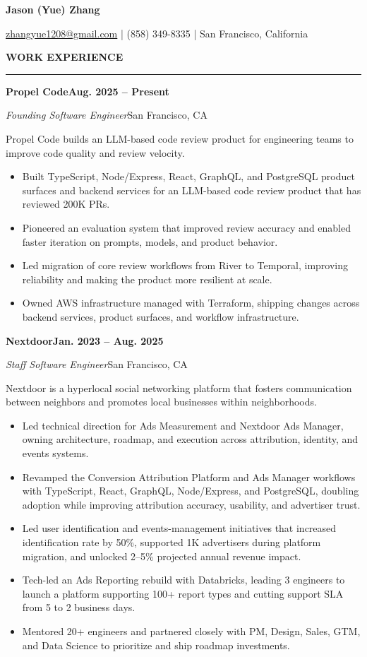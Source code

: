 \documentclass[10pt,letterpaper]{article}
\newcommand{\resumesection}[1]{
  \vspace{10pt}
  {\normalsize\bfseries\MakeUppercase{#1}\par}
  \vspace{3pt}
  \hrule
  \vspace{7pt}
}
\newcommand{\companyheading}[2]{
  \noindent\textbf{#1}\hfill\textbf{#2}\par
}
\newcommand{\roleheading}[2]{
  \noindent\textit{#1}\hfill #2\par
}
\newcommand{\companysummary}[1]{
  {\small #1\par}
  \vspace{2pt}
}
\newcommand{\entryspace}{
  \vspace{6pt}
}
\begin{document}
{\LARGE \textbf{Jason (Yue) Zhang}\par}
\vspace{4pt}
{\normalsize
\href{mailto:zhangyue1208@gmail.com}{zhangyue1208@gmail.com}
\;|\;
(858) 349-8335
\;|\;
San Francisco, California\par
}

\resumesection{Work Experience}

\companyheading{Propel Code}{Aug. 2025 -- Present}
\roleheading{Founding Software Engineer}{San Francisco, CA}
\companysummary{Propel Code builds an LLM-based code review product for engineering teams to improve code quality and review velocity.}
\begin{itemize}\small
  \item Built TypeScript, Node/Express, React, GraphQL, and PostgreSQL product surfaces and backend services for an LLM-based code review product that has reviewed 200K PRs.
  \item Pioneered an evaluation system that improved review accuracy and enabled faster iteration on prompts, models, and product behavior.
  \item Led migration of core review workflows from River to Temporal, improving reliability and making the product more resilient at scale.
  \item Owned AWS infrastructure managed with Terraform, shipping changes across backend services, product surfaces, and workflow infrastructure.
\end{itemize}
\entryspace
\normalsize

\companyheading{Nextdoor}{Jan. 2023 -- Aug. 2025}
\roleheading{Staff Software Engineer}{San Francisco, CA}
\companysummary{Nextdoor is a hyperlocal social networking platform that fosters communication between neighbors and promotes local businesses within neighborhoods.}
\begin{itemize}\small
  \item Led technical direction for Ads Measurement and Nextdoor Ads Manager, owning architecture, roadmap, and execution across attribution, identity, and events systems.
  \item Revamped the Conversion Attribution Platform and Ads Manager workflows with TypeScript, React, GraphQL, Node/Express, and PostgreSQL, doubling adoption while improving attribution accuracy, usability, and advertiser trust.
  \item Led user identification and events-management initiatives that increased identification rate by 50\%, supported 1K advertisers during platform migration, and unlocked 2--5\% projected annual revenue impact.
  \item Tech-led an Ads Reporting rebuild with Databricks, leading 3 engineers to launch a platform supporting 100+ report types and cutting support SLA from 5 to 2 business days.
  \item Mentored 20+ engineers and partnered closely with PM, Design, Sales, GTM, and Data Science to prioritize and ship roadmap investments.
\end{itemize}
\entryspace
\normalsize
\end{document}
